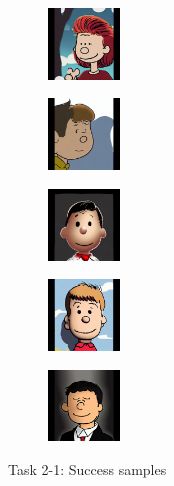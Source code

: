 \documentclass{article}
\begin{document}
\begin{enumerate}
\begin{enumerate}
\begin{figure}[h!]
\begin{minipage}{0.8\textwidth}
						\begin{subfigure}[b]{0.18\textwidth}
							\centering
							\includegraphics[height=1.9cm]{000002_styled}
						\end{subfigure}
						\hfill
						\begin{subfigure}[b]{0.18\textwidth}
							\centering
							\includegraphics[height=1.9cm]{000003_styled}
						\end{subfigure}
						\hfill
						\begin{subfigure}[b]{0.18\textwidth}
							\centering
							\includegraphics[height=1.9cm]{000012_styled}
						\end{subfigure}
						\hfill
						\begin{subfigure}[b]{0.18\textwidth}
							\centering
							\includegraphics[height=1.9cm]{000005_styled}
						\end{subfigure}
						\hfill
						\begin{subfigure}[b]{0.18\textwidth}
							\centering
							\includegraphics[height=1.9cm]{000055_styled}
						\end{subfigure}

						\caption{Task 2-1: Success samples}
						\vspace{0.6cm} %


\end{minipage}
\end{figure}
\end{enumerate}
\end{enumerate}
\end{document}
